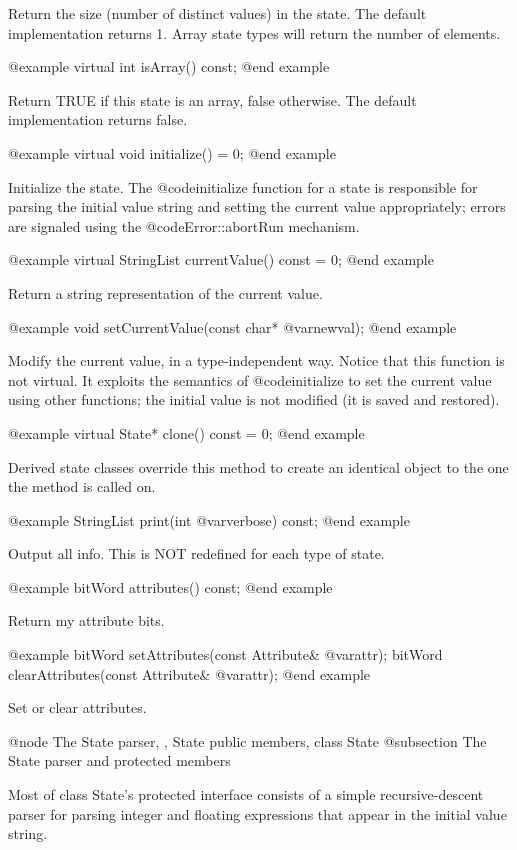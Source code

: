 Return the size (number of distinct values) in the state.  The
default implementation returns 1.  Array state types will return the
number of elements.

@example
virtual int isArray() const;
@end example

Return TRUE if this state is an array, false otherwise.  The default
implementation returns false.

@example
virtual void initialize() = 0;
@end example

Initialize the state.  The @code{initialize} function for a state is
responsible for parsing the initial value string and setting the current
value appropriately; errors are signaled using the
@code{Error::abortRun} mechanism.

@example
virtual StringList currentValue() const = 0;
@end example

Return a string representation of the current value.

@example
void setCurrentValue(const char* @var{newval});
@end example

Modify the current value, in a type-independent way.  Notice that this
function is not virtual.  It exploits the semantics of @code{initialize}
to set the current value using other functions; the initial value is
not modified (it is saved and restored).

@example
virtual State* clone() const = 0;
@end example

Derived state classes override this method to create an identical
object to the one the method is called on.

@example
StringList print(int @var{verbose}) const;
@end example

Output all info.  This is NOT redefined for each type of state.

@example
bitWord attributes() const;
@end example

Return my attribute bits.

@example
bitWord setAttributes(const Attribute& @var{attr});
bitWord clearAttributes(const Attribute& @var{attr});
@end example

Set or clear attributes.

@node The State parser,  , State public members, class State
@subsection The State parser and protected members

Most of class State's protected interface consists of a simple
recursive-descent parser for parsing integer and floating expressions
that appear in the initial value string.

